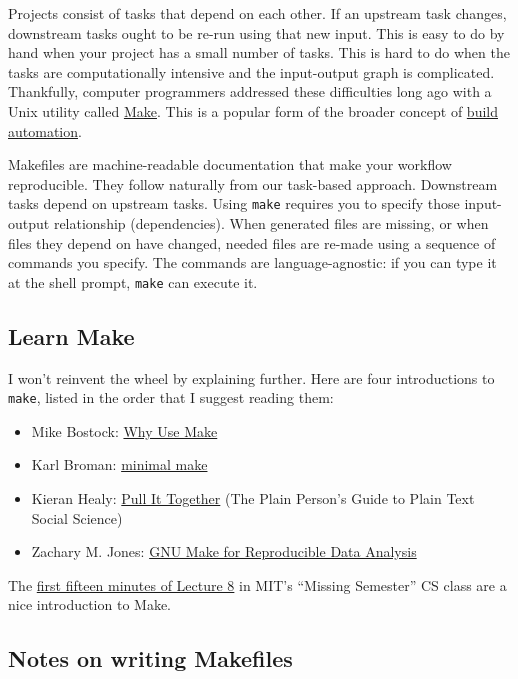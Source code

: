 Projects consist of tasks that depend on each other.
If an upstream task changes, downstream tasks ought to be re-run using that new input.
This is easy to do by hand when your project has a small number of tasks.
This is hard to do when the tasks are computationally intensive and the input-output graph is complicated.
Thankfully, computer programmers addressed these difficulties long ago with a Unix utility called \href{https://en.wikipedia.org/wiki/Make_(software)}{Make}.
This is a popular form of the broader concept of \href{https://tradediversion.net/2019/11/06/why-your-research-project-needs-build-automation/}{build automation}.

Makefiles are machine-readable documentation that make your workflow reproducible.
They follow naturally from our task-based approach.
Downstream tasks depend on upstream tasks.
Using \texttt{make} requires you to specify those input-output relationship (dependencies).
When generated files are missing, or when files they depend on have changed, needed files are re-made using a sequence of commands you specify.
The commands are language-agnostic: if you can type it at the shell prompt,
\texttt{make} can execute it.

\subsection{Learn Make}

I won't reinvent the wheel by explaining further.
Here are four introductions to \texttt{make}, listed in the order that I suggest reading them:
\begin{itemize}
\item Mike Bostock: \href{https://bost.ocks.org/mike/make/}{Why Use Make}
\item Karl Broman: \href{http://kbroman.org/minimal_make/}{minimal make}
\item Kieran Healy: \href{http://plain-text.co/pull-it-together.html}{Pull It Together} (The Plain Person's Guide to Plain Text Social Science)
\item Zachary M. Jones: \href{http://zmjones.com/make/}{GNU Make for Reproducible Data Analysis}
\end{itemize}

The \href{https://www.youtube.com/watch?v=_Ms1Z4xfqv4}{first fifteen minutes of Lecture 8} in MIT's ``Missing Semester'' CS class are a nice introduction to Make.

\subsection{Notes on writing Makefiles}

